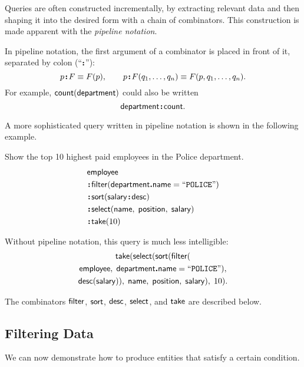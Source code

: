 Queries are often constructed incrementally, by extracting relevant data and
then shaping it into the desired form with a chain of combinators.  This
construction is made apparent with the \emph{pipeline notation}.

In pipeline notation, the first argument of a combinator is placed in front of
it, separated by colon (``$\,\!\boldsymbol{:}\!\,$''):
\begin{equation*}
    p \!\boldsymbol{:}\! F \equiv F(p), \qquad
    p \!\boldsymbol{:}\! F(q_1,\ldots,q_n) \equiv F(p,q_1,\ldots,q_n).
\end{equation*}
For example, $\mathsf{count}(\mathsf{department})$ could also be written
\begin{equation*}
    \mathsf{department}\!\boldsymbol{:}\!\mathsf{count}.
\end{equation*}

A more sophisticated query written in pipeline notation is shown in the
following example.

\begin{demo}
    \label{ex:top-ten-highest-paid-policemen}
    Show the top 10 highest paid employees in the Police department.
    \begin{align*}
        & \Employee \\
        & \Apply\Filter(\Department\To\Name = \textliteral{POLICE}) \\
        & \Apply\Sort(\Salary\Apply\Desc) \\
        & \Apply\Select(\Name,\; \Position,\; \Salary) \\
        & \Apply\Take(10)
    \end{align*}
\end{demo}

Without pipeline notation, this query is much less intelligible:
\begin{multline*}
    \mathsf{take}(\mathsf{select}(\mathsf{sort}(\mathsf{filter}( \\
    \mathsf{employee},\; \mathsf{department}\boldsymbol{.}\mathsf{name} = \mathtt{``POLICE"}), \\
    \mathsf{desc}(\mathsf{salary})),\; \mathsf{name},\; \mathsf{position},\; \mathsf{salary}),\; 10).
\end{multline*}

The combinators $\mathsf{filter}$, $\mathsf{sort}$, $\mathsf{desc}$, $\mathsf{select}$, and $\mathsf{take}$ are
described below.

\subsection*{Filtering Data}

We can now demonstrate how to produce entities that satisfy a certain
condition.

